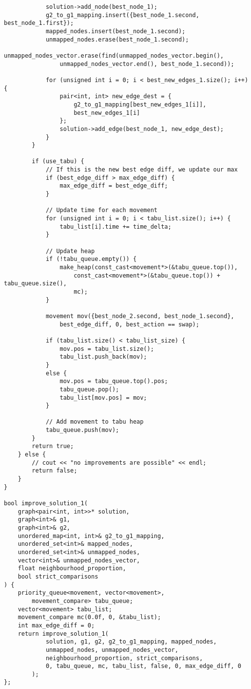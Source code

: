 \begin{lstlisting}
            solution->add_node(best_node_1);
            g2_to_g1_mapping.insert({best_node_1.second, best_node_1.first});
            mapped_nodes.insert(best_node_1.second);
            unmapped_nodes.erase(best_node_1.second);
            unmapped_nodes_vector.erase(find(unmapped_nodes_vector.begin(),
                unmapped_nodes_vector.end(), best_node_1.second));

            for (unsigned int i = 0; i < best_new_edges_1.size(); i++) {
                pair<int, int> new_edge_dest = {
                    g2_to_g1_mapping[best_new_edges_1[i]],
                    best_new_edges_1[i]
                };
                solution->add_edge(best_node_1, new_edge_dest);
            }
        }

        if (use_tabu) {
            // If this is the new best edge diff, we update our max
            if (best_edge_diff > max_edge_diff) {
                max_edge_diff = best_edge_diff;
            }

            // Update time for each movement
            for (unsigned int i = 0; i < tabu_list.size(); i++) {
                tabu_list[i].time += time_delta;
            }

            // Update heap
            if (!tabu_queue.empty()) {
                make_heap(const_cast<movement*>(&tabu_queue.top()),
                    const_cast<movement*>(&tabu_queue.top()) + tabu_queue.size(),
                    mc);
            }

            movement mov({best_node_2.second, best_node_1.second},
                best_edge_diff, 0, best_action == swap);

            if (tabu_list.size() < tabu_list_size) {
                mov.pos = tabu_list.size();
                tabu_list.push_back(mov);
            }
            else {
                mov.pos = tabu_queue.top().pos;
                tabu_queue.pop();
                tabu_list[mov.pos] = mov;
            }

            // Add movement to tabu heap
            tabu_queue.push(mov);
        }
        return true;
    } else {
        // cout << "no improvements are possible" << endl;
        return false;
    }
}

bool improve_solution_1(
    graph<pair<int, int>>* solution,
    graph<int>& g1,
    graph<int>& g2,
    unordered_map<int, int>& g2_to_g1_mapping,
    unordered_set<int>& mapped_nodes,
    unordered_set<int>& unmapped_nodes,
    vector<int>& unmapped_nodes_vector,
    float neighbourhood_proportion,
    bool strict_comparisons
) {
    priority_queue<movement, vector<movement>,
        movement_compare> tabu_queue;
    vector<movement> tabu_list;
    movement_compare mc(0.0f, 0, &tabu_list);
    int max_edge_diff = 0;
    return improve_solution_1(
            solution, g1, g2, g2_to_g1_mapping, mapped_nodes,
            unmapped_nodes, unmapped_nodes_vector,
            neighbourhood_proportion, strict_comparisons,
            0, tabu_queue, mc, tabu_list, false, 0, max_edge_diff, 0
        );
};


\end{lstlisting}
